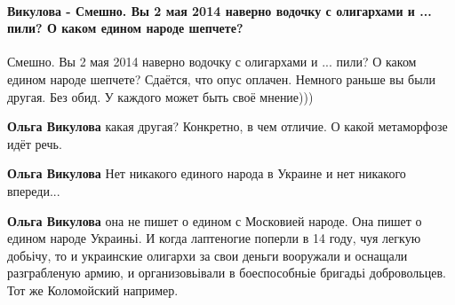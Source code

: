  
 
 
 
 
\paragraph{Викулова - Смешно. Вы 2 мая 2014 наверно водочку с олигархами и ... пили?  О каком едином народе шепчете?}

\begin{itemize}
 
Смешно.
Вы 2 мая 2014 наверно водочку с олигархами и ... пили?
О каком едином народе шепчете?
Сдаётся, что опус оплачен. Немного раньше вы были другая.
Без обид. У каждого может быть своё мнение)))

\begin{itemize}

 
\textbf{Ольга Викулова} какая другая? Конкретно, в чем отличие. О какой метаморфозе идёт речь.

 
\textbf{Ольга Викулова} Нет никакого единого народа в Украине и нет никакого впереди...

 
\textbf{Ольга Викулова} она не пишет о едином с Московией народе. Она пишет о
едином народе Украиньі. И когда лаптеногие поперли в 14 году, чуя легкую
добьічу, то и украинские олигархи за свои деньги вооружали и оснащали
разграбленую армию, и организовьівали в боеспособньіе бригадьі добровольцев.
Тот же Коломойский например.


\end{itemize}
\end{itemize}
